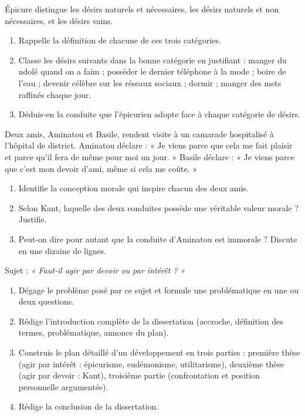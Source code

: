 \documentclass[11pt]{article}
\newcounter{popsec}
\newcounter{popsub}
\newcommand{\courssub}[1]{%
  \stepcounter{popsub}%
  \par\vspace{9pt}\noindent{\popxbold\fontsize{11.5}{13}\selectfont\color{popink}{\color{poporange}\thepopsec.\thepopsub}\hspace{6pt}#1}\par\nopagebreak\vspace{4pt}
}
\begin{document}
\begin{exercice}
Épicure distingue les désirs naturels et nécessaires, les désirs naturels et non nécessaires, et les désirs vains.
\begin{enumerate}
\item Rappelle la définition de chacune de ces trois catégories.
\item Classe les désirs suivants dans la bonne catégorie en justifiant : manger du ndolé quand on a faim ; posséder le dernier téléphone à la mode ; boire de l'eau ; devenir célèbre sur les réseaux sociaux ; dormir ; manger des mets raffinés chaque jour.
\item Déduis-en la conduite que l'épicurien adopte face à chaque catégorie de désirs.
\end{enumerate}
\end{exercice}

\begin{exercice}
Deux amis, Aminatou et Basile, rendent visite à un camarade hospitalisé à l'hôpital de district. Aminatou déclare : « Je viens parce que cela me fait plaisir et parce qu'il fera de même pour moi un jour. » Basile déclare : « Je viens parce que c'est mon devoir d'ami, même si cela me coûte. »
\begin{enumerate}
\item Identifie la conception morale qui inspire chacun des deux amis.
\item Selon Kant, laquelle des deux conduites possède une véritable valeur morale ? Justifie.
\item Peut-on dire pour autant que la conduite d'Aminatou est immorale ? Discute en une dizaine de lignes.
\end{enumerate}
\end{exercice}

\courssub{Je me prépare au Bac}

\begin{exercice}
Sujet : \emph{« Faut-il agir par devoir ou par intérêt ? »}
\begin{enumerate}
\item Dégage le problème posé par ce sujet et formule une problématique en une ou deux questions.
\item Rédige l'introduction complète de la dissertation (accroche, définition des termes, problématique, annonce du plan).
\item Construis le plan détaillé d'un développement en trois parties : première thèse (agir par intérêt : épicurisme, eudémonisme, utilitarisme), deuxième thèse (agir par devoir : Kant), troisième partie (confrontation et position personnelle argumentée).
\item Rédige la conclusion de la dissertation.
\end{enumerate}
\end{exercice}
\end{document}
